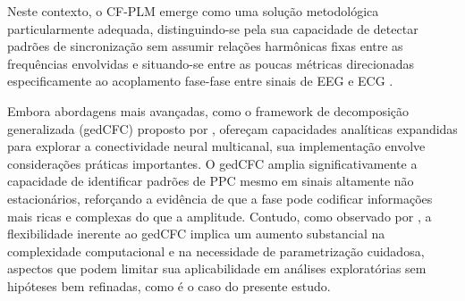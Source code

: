 Neste contexto, o CF-PLM emerge como uma solução metodológica particularmente adequada, distinguindo-se pela sua capacidade de detectar padrões de sincronização sem assumir relações harmônicas fixas entre as frequências envolvidas e situando-se entre as poucas métricas direcionadas especificamente ao acoplamento fase-fase entre sinais de EEG e ECG \cite{sorrentino2022detection}.

Embora abordagens mais avançadas, como o framework de decomposição generalizada (gedCFC) proposto por , ofereçam capacidades analíticas expandidas para explorar a conectividade neural multicanal, sua implementação envolve considerações práticas importantes. O gedCFC amplia significativamente a capacidade de identificar padrões de PPC mesmo em sinais altamente não estacionários, reforçando a evidência de que a fase pode codificar informações mais ricas e complexas do que a amplitude. Contudo, como observado por , a flexibilidade inerente ao gedCFC implica um aumento substancial na complexidade computacional e na necessidade de parametrização cuidadosa, aspectos que podem limitar sua aplicabilidade em análises exploratórias sem hipóteses bem refinadas, como é o caso do presente estudo.

